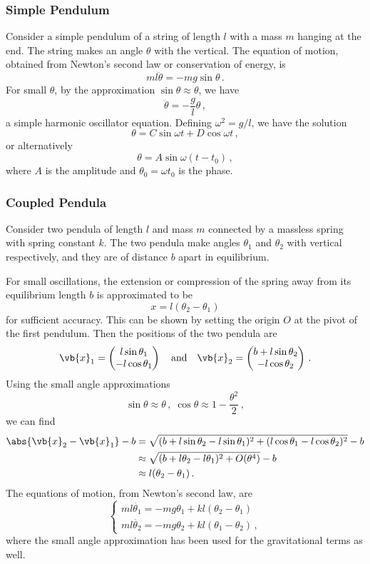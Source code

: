 \documentclass{article}
\theoremstyle{plain}\theoremheaderfont{\normalfont\itshape}\theorembodyfont{\rmfamily}\theoremseparator{.}\newtheorem*{rem}{Remark}\newtheorem*{ex}{Example}\newtheorem*{proof}{Proof}\newtheorem*{altp}{Alternative proof}
\theoremstyle{plain}\theoremheaderfont{\normalfont\bfseries}\theorembodyfont{\rmfamily}\theoremseparator{.}\newtheorem{thm}{Theorem}[section]\newtheorem{lem}[thm]{Lemma}\newtheorem{prop}[thm]{Proposition}\newtheorem*{cor}{Corollary}\newtheorem{defn}[thm]{Definition}\newtheorem{clm}[thm]{Claim}\newtheorem{clminproof}{Claim}
\theoremstyle{break}\theoremheaderfont{\normalfont\itshape}\theorembodyfont{\rmfamily}\theoremseparator{.\medskip}\newtheorem*{proofskip}{Proof}\newtheorem*{exs}{Examples}\newtheorem*{rems}{Remarks}
\theoremstyle{break}\theoremheaderfont{\normalfont\bfseries}\theorembodyfont{\rmfamily}\theoremseparator{.\medskip}\newtheorem{lemskip}[thm]{Lemma}\newtheorem{defnskip}[thm]{Definition}\newtheorem{propskip}[thm]{Proposition}\newtheorem{thmskip}[thm]{Theorem}
\numberwithin{equation}{section}
\begin{document}
	\subsubsection{Simple Pendulum}
	Consider a simple pendulum of a string of length \(l\) with a mass \(m\) hanging at the end. The string makes an angle \(\theta\) with the vertical. The equation of motion, obtained from Newton's second law or conservation of energy, is
	\[ml\ddot{\theta}=-mg\sin\theta\,.\]
	For small \(\theta\), by the approximation \(\sin\theta\approx\theta\), we have
	\[\ddot{\theta}=-\frac{g}{l}\theta\,,\]
	a simple harmonic oscillator equation. Defining \(\omega^2=g/l\), we have the solution
	\[\theta=C\sin\omega t+D\cos\omega t\,,\]
	or alternatively
	\[\theta=A\sin\omega(t-t_0)\,,\]
	where \(A\) is the amplitude and \(\theta_0=\omega t_0\) is the phase.
	\subsubsection{Coupled Pendula}
	Consider two pendula of length \(l\) and mass \(m\) connected by a massless spring with spring constant \(k\). The two pendula make angles \(\theta_1\) and \(\theta_2\) with vertical respectively, and they are of distance \(b\) apart in equilibrium.

	For small oscillations, the extension or compression of the spring away from its equilibrium length \(b\) is approximated to be
	\[x=l(\theta_2-\theta_1)\]
	for sufficient accuracy. This can be shown by setting the origin \(O\) at the pivot of the first pendulum. Then the positions of the two pendula are
	\[\vb{x}_1=\begin{pmatrix}
		l\sin\theta_1\\
		-l\cos\theta_1
	\end{pmatrix}\quad\text{and}\quad\vb{x}_2=\begin{pmatrix}
		b+l\sin\theta_2\\
		-l\cos\theta_2
	\end{pmatrix}\,.\]
	Using the small angle approximations
	\[\sin\theta\approx\theta\,,\;\cos\theta\approx 1-\frac{\theta^2}{2}\,,\]
	we can find
	\begin{align*}
		\abs{\vb{x}_2-\vb{x}_1}-b&=\sqrt{(b+l\sin\theta_2-l\sin\theta_1)^2+(l\cos\theta_1-l\cos\theta_2)^2}-b\\
		&\approx\sqrt{(b+l\theta_2-l\theta_1)^2+O(\theta^4)}-b\\
		&\approx l(\theta_2-\theta_1)\,.
	\end{align*}
	The equations of motion, from Newton's second law, are
	\[\begin{cases}
		ml\ddot{\theta_1}=-mg\theta_1+kl(\theta_2-\theta_1)\\
		ml\ddot{\theta_2}=-mg\theta_2+kl(\theta_1-\theta_2)\,,
	\end{cases}\]
	where the small angle approximation has been used for the gravitational terms as well.
\end{document}
